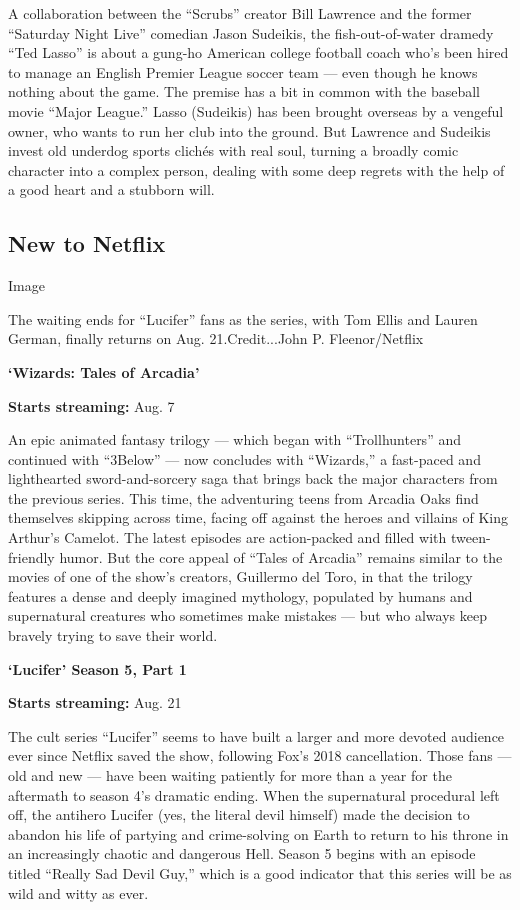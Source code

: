 A collaboration between the ``Scrubs'' creator Bill Lawrence and the
former ``Saturday Night Live'' comedian Jason Sudeikis, the
fish-out-of-water dramedy ``Ted Lasso'' is about a gung-ho American
college football coach who's been hired to manage an English Premier
League soccer team --- even though he knows nothing about the game. The
premise has a bit in common with the baseball movie ``Major League.''
Lasso (Sudeikis) has been brought overseas by a vengeful owner, who
wants to run her club into the ground. But Lawrence and Sudeikis invest
old underdog sports clichés with real soul, turning a broadly comic
character into a complex person, dealing with some deep regrets with the
help of a good heart and a stubborn will.

\hypertarget{new-to-netflix}{%
\subsection{New to Netflix}\label{new-to-netflix}}

Image

The waiting ends for ``Lucifer'' fans as the series, with Tom Ellis and
Lauren German, finally returns on Aug. 21.Credit...John P.
Fleenor/Netflix

\textbf{`Wizards: Tales of Arcadia'}

\textbf{Starts streaming:} Aug. 7

An epic animated fantasy trilogy --- which began with ``Trollhunters''
and continued with ``3Below'' --- now concludes with ``Wizards,'' a
fast-paced and lighthearted sword-and-sorcery saga that brings back the
major characters from the previous series. This time, the adventuring
teens from Arcadia Oaks find themselves skipping across time, facing off
against the heroes and villains of King Arthur's Camelot. The latest
episodes are action-packed and filled with tween-friendly humor. But the
core appeal of ``Tales of Arcadia'' remains similar to the movies of one
of the show's creators, Guillermo del Toro, in that the trilogy features
a dense and deeply imagined mythology, populated by humans and
supernatural creatures who sometimes make mistakes --- but who always
keep bravely trying to save their world.

\textbf{`Lucifer' Season 5, Part 1}

\textbf{Starts streaming:} Aug. 21

The cult series ``Lucifer'' seems to have built a larger and more
devoted audience ever since Netflix saved the show, following Fox's 2018
cancellation. Those fans --- old and new --- have been waiting patiently
for more than a year for the aftermath to season 4's dramatic ending.
When the supernatural procedural left off, the antihero Lucifer (yes,
the literal devil himself) made the decision to abandon his life of
partying and crime-solving on Earth to return to his throne in an
increasingly chaotic and dangerous Hell. Season 5 begins with an episode
titled ``Really Sad Devil Guy,'' which is a good indicator that this
series will be as wild and witty as ever.

